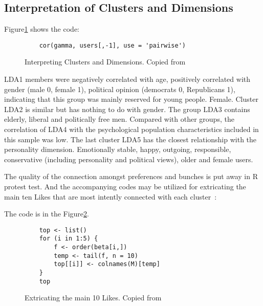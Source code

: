 \subsection{Interpretation of Clusters and Dimensions~\cite{hid515-12}}

Figure\ref{F:interpreting} shows the code:

\begin{figure}[htb]
\begin{footnotesize}
\begin{verbatim}
    cor(gamma, users[,-1], use = 'pairwise')
\end{verbatim}
\end{footnotesize}
\caption{Interpreting Clusters and Dimensions. 
Copied from~\cite{hid515-12}}
\label{F:interpreting}
\end{figure}


LDA1 members were negatively correlated with age, positively 
correlated with gender (male 0, female 1), political opinion 
(democrats 0, Republicans 1), indicating that this group was mainly
 reserved for young people. Female. Cluster LDA2 is similar but has
 nothing to do with gender. The group LDA3 contains elderly, 
liberal and politically free men. Compared with other groups, the 
correlation of LDA4 with the psychological population 
characteristics included in this sample was low. The last cluster 
LDA5 has the closest relationship with the personality dimension. 
Emotionally stable, happy, outgoing, responsible, conservative 
(including personality and political views), older and female users.

The quality of the connection amongst preferences and bunches is 
put away in R protest test. And the accompanying codes may be 
utilized for extricating the main ten Likes that are most intently 
connected with each cluster~\cite{hid515-12}:

The code is in the Figure\ref{F:extricate}.

\begin{figure}[htb]
\begin{footnotesize}
\begin{verbatim}
    top <- list()
    for (i in 1:5) {
        f <- order(beta[i,])
        temp <- tail(f, n = 10)
        top[[i]] <- colnames(M)[temp]
    }
    top
\end{verbatim}
\end{footnotesize}
\caption{Extricating the main 10 Likes. Copied from~\cite{hid515-12}}
\label{F:extricate}
\end{figure}


